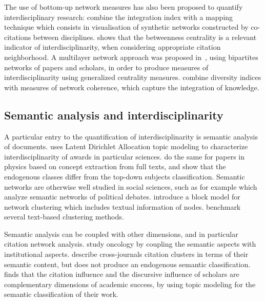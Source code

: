 The use of bottom-up network measures has also been proposed to quantify interdisciplinary research: \cite{porter2009science} combine the integration index with a mapping technique which consists in visualisation of synthetic networks constructed by co-citations between disciplines. \cite{leydesdorff2007betweenness} shows that the betweenness centrality is a relevant indicator of interdisciplinarity, when considering appropriate citation neighborhood. A multilayer network approach was proposed in~\cite{omodei2017evaluating}, using bipartites networks of papers and scholars, in order to produce measures of interdisciplinarity using generalized centrality measures. \cite{rafols2009diversity} combine diversity indices with measures of network coherence, which capture the integration of knowledge.


\subsection*{Semantic analysis and interdisciplinarity}

A particular entry to the quantification of interdisciplinarity is semantic analysis of documents. \cite{nichols2014topic} uses Latent Dirichlet Allocation topic modeling to characterize interdisciplinarity of awards in particular sciences. \cite{palchykov2016ground} do the same for papers in physics based on concept extraction from full texts, and show that the endogenous classes differ from the top-down subjects classification. Semantic networks are otherwise well studied in social sciences, such as for example \cite{2015arXiv151003797G} which analyze semantic networks of political debates. \cite{bouveyron2016stochastic} introduce a block model for network clustering which includes textual information of nodes. \cite{10.1371/journal.pone.0018029} benchmark several text-based clustering methods.

Semantic analysis can be coupled with other dimensions, and in particular citation network analysis. \cite{bras2017oncology} study oncology by coupling the semantic aspects with institutional aspects. \cite{zhang2010journal} describe cross-journals citation clusters in terms of their semantic content, but does not produce an endogenous semantic classification. \cite{gerow2018measuring} finds that the citation influence and the discursive influence of scholars are complementary dimensions of academic success, by using topic modeling for the semantic classification of their work.



